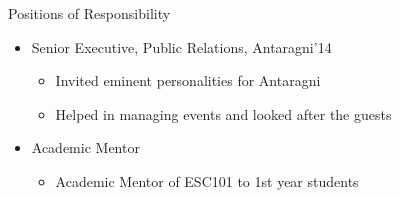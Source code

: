 \documentclass{article}
\begin{document}
\vspace{10pt}
{\Large Positions of Responsibility}
\begin{itemize}
\item Senior Executive, Public Relations, Antaragni’14
	\begin{itemize}
	\item Invited eminent personalities for Antaragni
	\item Helped in managing events and looked after the guests
	\end{itemize}
\item Academic Mentor
\begin{itemize}
\item Academic Mentor of ESC101 to 1st year students
\end{itemize}
\end{itemize}
\end{document}
